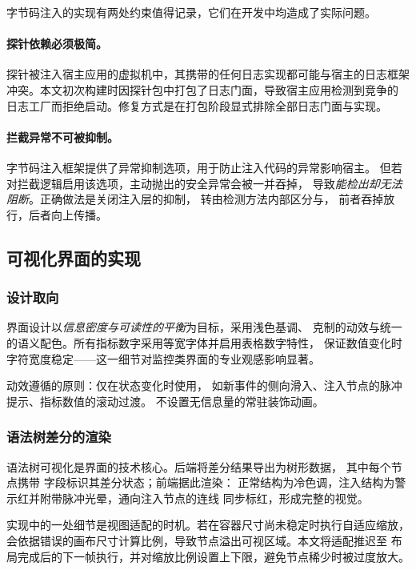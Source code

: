字节码注入的实现有两处约束值得记录，它们在开发中均造成了实际问题。

\paragraph{探针依赖必须极简。}
探针被注入宿主应用的虚拟机中，其携带的任何日志实现都可能与宿主的日志框架
冲突。本文初次构建时因探针包中打包了日志门面，导致宿主应用检测到竞争的
日志工厂而拒绝启动。修复方式是在打包阶段显式排除全部日志门面与实现。

\paragraph{拦截异常不可被抑制。}
字节码注入框架提供了异常抑制选项，用于防止注入代码的异常影响宿主。
但若对拦截逻辑启用该选项，主动抛出的安全异常会被一并吞掉，
导致\emph{能检出却无法阻断}。正确做法是关闭注入层的抑制，
转由检测方法内部区分与，
前者吞掉放行，后者向上传播。

\subsection{可视化界面的实现}

\subsubsection{设计取向}

界面设计以\emph{信息密度与可读性的平衡}为目标，采用浅色基调、
克制的动效与统一的语义配色。所有指标数字采用等宽字体并启用表格数字特性，
保证数值变化时字符宽度稳定——这一细节对监控类界面的专业观感影响显著。

动效遵循的原则：仅在状态变化时使用，
如新事件的侧向滑入、注入节点的脉冲提示、指标数值的滚动过渡。
不设置无信息量的常驻装饰动画。

\subsubsection{语法树差分的渲染}

语法树可视化是界面的技术核心。后端将差分结果导出为树形数据，
其中每个节点携带  字段标识其差分状态；前端据此渲染：
正常结构为冷色调，注入结构为警示红并附带脉冲光晕，通向注入节点的连线
同步标红，形成完整的视觉。

实现中的一处细节是视图适配的时机。若在容器尺寸尚未稳定时执行自适应缩放，
会依据错误的画布尺寸计算比例，导致节点溢出可视区域。本文将适配推迟至
布局完成后的下一帧执行，并对缩放比例设置上下限，避免节点稀少时被过度放大。

